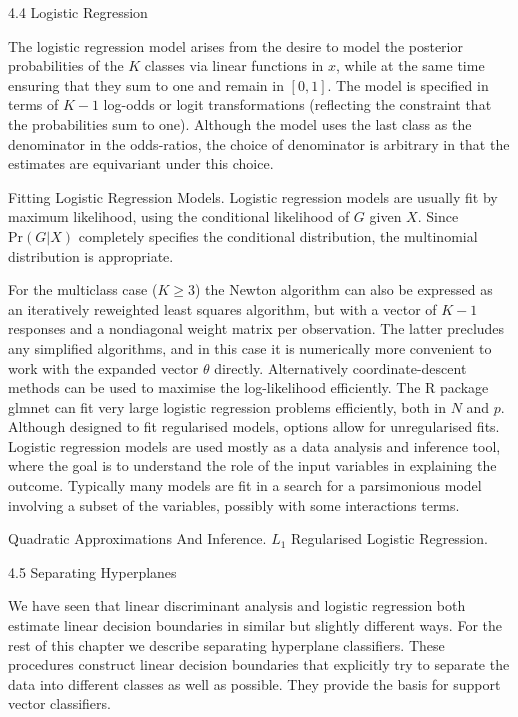 4.4 Logistic Regression

The logistic regression model arises from the desire to model the posterior probabilities of the $K$ classes via linear functions in $x$, while at the same time ensuring that they sum to one and remain in $[0,1]$. The model is specified in terms of $K-1$ log-odds or logit transformations (reflecting the constraint that the probabilities sum to one). Although the model uses the last class as the denominator in the odds-ratios, the choice of denominator is arbitrary in that the estimates are equivariant under this choice.

Fitting Logistic Regression Models. Logistic regression models are usually fit by maximum likelihood, using the conditional likelihood of $G$ given $X$. Since $\text{Pr}(G | X)$ completely specifies the conditional distribution, the multinomial distribution is appropriate.

For the multiclass case ($K \ge 3$) the Newton algorithm can also be expressed as an iteratively reweighted least squares algorithm, but with a vector of $K-1$ responses and a nondiagonal weight matrix per observation. The latter precludes any simplified algorithms, and in this case it is numerically more convenient to work with the expanded vector $\theta$ directly. Alternatively coordinate-descent methods can be used to maximise the log-likelihood efficiently. The R package glmnet can fit very large logistic regression problems efficiently, both in $N$ and $p$. Although designed to fit regularised models, options allow for unregularised fits. Logistic regression models are used mostly as a data analysis and inference tool, where the goal is to understand the role of the input variables in explaining the outcome. Typically many models are fit in a search for a parsimonious model involving a subset of the variables, possibly with some interactions terms.

Quadratic Approximations And Inference. $L_1$ Regularised Logistic Regression.

4.5 Separating Hyperplanes

We have seen that linear discriminant analysis and logistic regression both estimate linear decision boundaries in similar but slightly different ways. For the rest of this chapter we describe separating hyperplane classifiers. These procedures construct linear decision boundaries that explicitly try to separate the data into different classes as well as possible. They provide the basis for support vector classifiers.

